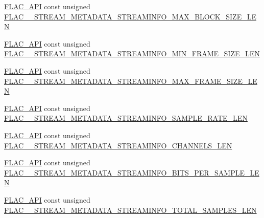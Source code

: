 \begin{DoxyCompactItemize}
\item 
\mbox{\hyperlink{group__flac__export_ga56ca07df8a23310707732b1c0007d6f5}{F\+L\+A\+C\+\_\+\+A\+PI}} const unsigned \mbox{\hyperlink{group__flac__format_ga6f069aa2f887122aa88f65e5fae2f0e7}{F\+L\+A\+C\+\_\+\+\_\+\+S\+T\+R\+E\+A\+M\+\_\+\+M\+E\+T\+A\+D\+A\+T\+A\+\_\+\+S\+T\+R\+E\+A\+M\+I\+N\+F\+O\+\_\+\+M\+A\+X\+\_\+\+B\+L\+O\+C\+K\+\_\+\+S\+I\+Z\+E\+\_\+\+L\+EN}}
\item 
\mbox{\hyperlink{group__flac__export_ga56ca07df8a23310707732b1c0007d6f5}{F\+L\+A\+C\+\_\+\+A\+PI}} const unsigned \mbox{\hyperlink{group__flac__format_ga0bdf42bf21ece52817dbc3d70c3cf73f}{F\+L\+A\+C\+\_\+\+\_\+\+S\+T\+R\+E\+A\+M\+\_\+\+M\+E\+T\+A\+D\+A\+T\+A\+\_\+\+S\+T\+R\+E\+A\+M\+I\+N\+F\+O\+\_\+\+M\+I\+N\+\_\+\+F\+R\+A\+M\+E\+\_\+\+S\+I\+Z\+E\+\_\+\+L\+EN}}
\item 
\mbox{\hyperlink{group__flac__export_ga56ca07df8a23310707732b1c0007d6f5}{F\+L\+A\+C\+\_\+\+A\+PI}} const unsigned \mbox{\hyperlink{group__flac__format_gaa206d2c029642f1ad22b101f071d010b}{F\+L\+A\+C\+\_\+\+\_\+\+S\+T\+R\+E\+A\+M\+\_\+\+M\+E\+T\+A\+D\+A\+T\+A\+\_\+\+S\+T\+R\+E\+A\+M\+I\+N\+F\+O\+\_\+\+M\+A\+X\+\_\+\+F\+R\+A\+M\+E\+\_\+\+S\+I\+Z\+E\+\_\+\+L\+EN}}
\item 
\mbox{\hyperlink{group__flac__export_ga56ca07df8a23310707732b1c0007d6f5}{F\+L\+A\+C\+\_\+\+A\+PI}} const unsigned \mbox{\hyperlink{group__flac__format_gad0d8c637c666ef08cad2d9668f3e9ecf}{F\+L\+A\+C\+\_\+\+\_\+\+S\+T\+R\+E\+A\+M\+\_\+\+M\+E\+T\+A\+D\+A\+T\+A\+\_\+\+S\+T\+R\+E\+A\+M\+I\+N\+F\+O\+\_\+\+S\+A\+M\+P\+L\+E\+\_\+\+R\+A\+T\+E\+\_\+\+L\+EN}}
\item 
\mbox{\hyperlink{group__flac__export_ga56ca07df8a23310707732b1c0007d6f5}{F\+L\+A\+C\+\_\+\+A\+PI}} const unsigned \mbox{\hyperlink{group__flac__format_gadc990fec49da063c33debfc2817c0e98}{F\+L\+A\+C\+\_\+\+\_\+\+S\+T\+R\+E\+A\+M\+\_\+\+M\+E\+T\+A\+D\+A\+T\+A\+\_\+\+S\+T\+R\+E\+A\+M\+I\+N\+F\+O\+\_\+\+C\+H\+A\+N\+N\+E\+L\+S\+\_\+\+L\+EN}}
\item 
\mbox{\hyperlink{group__flac__export_ga56ca07df8a23310707732b1c0007d6f5}{F\+L\+A\+C\+\_\+\+A\+PI}} const unsigned \mbox{\hyperlink{group__flac__format_ga84c55a68f58fff56e23fda6d24bd3510}{F\+L\+A\+C\+\_\+\+\_\+\+S\+T\+R\+E\+A\+M\+\_\+\+M\+E\+T\+A\+D\+A\+T\+A\+\_\+\+S\+T\+R\+E\+A\+M\+I\+N\+F\+O\+\_\+\+B\+I\+T\+S\+\_\+\+P\+E\+R\+\_\+\+S\+A\+M\+P\+L\+E\+\_\+\+L\+EN}}
\item 
\mbox{\hyperlink{group__flac__export_ga56ca07df8a23310707732b1c0007d6f5}{F\+L\+A\+C\+\_\+\+A\+PI}} const unsigned \mbox{\hyperlink{group__flac__format_ga061dcc54018329ac1b893d95b3970ebc}{F\+L\+A\+C\+\_\+\+\_\+\+S\+T\+R\+E\+A\+M\+\_\+\+M\+E\+T\+A\+D\+A\+T\+A\+\_\+\+S\+T\+R\+E\+A\+M\+I\+N\+F\+O\+\_\+\+T\+O\+T\+A\+L\+\_\+\+S\+A\+M\+P\+L\+E\+S\+\_\+\+L\+EN}}

\end{DoxyCompactItemize}
